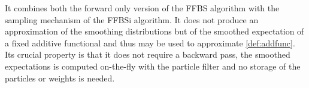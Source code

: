\documentclass[12pt,draft]{article}
\newcommand{\1}{\mathrm{1}}
\begin{document}
It combines both the forward only version of the FFBS algorithm with the sampling mechanism of the FFBSi algorithm. It does not produce an approximation of the smoothing distributions but of the smoothed expectation of a fixed additive functional and thus  may be used to approximate \eqref{def:addfunc}. 
Its crucial property is that it does not require a backward pass, the smoothed expectations is computed on-the-fly with the particle filter and no storage of the particles or weights is needed. 
\end{document}
